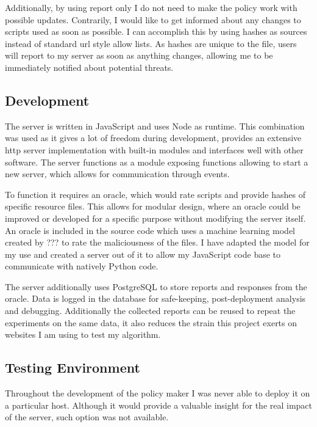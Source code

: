 Additionally, by using report only I do not need to make the policy work with possible updates.
Contrarily, I would like to get informed about any changes to scripts used as soon as possible.
I can accomplish this by using hashes as sources instead of standard url style allow lists.
As hashes are unique to the file, users will report to my server as soon as anything changes, allowing me to be immediately notified about potential threats.

\subsection{Development}

The server is written in JavaScript and uses Node as runtime.
This combination was used as it gives a lot of freedom during development, provides an extensive http server implementation with built-in modules and interfaces well with other software.
The server functions as a module exposing functions allowing to start a new server, which allows for communication through events.

To function it requires an oracle, which would rate scripts and provide hashes of specific resource files.
This allows for modular design, where an oracle could be improved or developed for a specific purpose without modifying the server itself.
An oracle is included in the source code which uses a machine learning model created by ??? to rate the maliciousness of the files.
I have adapted the model for my use and created a server out of it to allow my JavaScript code base to communicate with natively Python code.

The server additionally uses PostgreSQL to store reports and responses from the oracle.
Data is logged in the database for safe-keeping, post-deployment analysis and debugging.
Additionally the collected reports can be reused to repeat the experiments on the same data, it also reduces the strain this project exerts on websites I am using to test my algorithm.


\subsection{Testing Environment}

Throughout the development of the policy maker I was never able to deploy it on a particular host.
Although it would provide a valuable insight for the real impact of the server, such option was not available.

